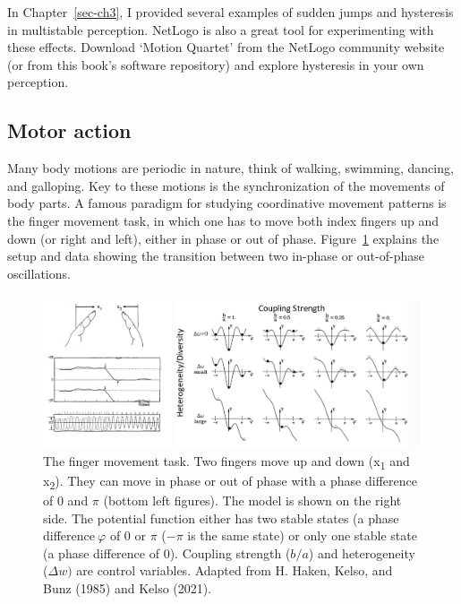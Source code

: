 \documentclass[
  a4paper,
  DIV=11,
  numbers=noendperiod,
  oneside]{scrreprt}
\begin{document}
In Chapter~\ref{sec-ch3}, I provided several examples of sudden jumps
and hysteresis in multistable perception. NetLogo is also a great tool
for experimenting with these effects. Download `Motion Quartet' from the
NetLogo community website (or from this book's software repository) and
explore hysteresis in your own perception.

\hypertarget{sec-Motor-action}{%
\subsection{Motor action}\label{sec-Motor-action}}

Many body motions are periodic in nature, think of walking, swimming,
dancing, and galloping. Key to these motions is the synchronization of
the movements of body parts. A famous paradigm for studying coordinative
movement patterns is the finger movement task, in which one has to move
both index fingers up and down (or right and left), either in phase or
out of phase. Figure~\ref{fig-ch5n-img7-old-45} explains the setup and
data showing the transition between two in-phase or out-of-phase
oscillations.

\begin{figure}

{\centering \includegraphics{media/ch5n/image7.jpg}

}

\caption{\label{fig-ch5n-img7-old-45}The finger movement task. Two
fingers move up and down (x\textsubscript{1} and x\textsubscript{2}).
They can move in phase or out of phase with a phase difference of 0 and
\(\pi\) (bottom left figures). The model is shown on the right side. The
potential function either has two stable states (a phase
difference\(\ \varphi\) of 0 or \(\pi\) (\(- \pi\) is the same state) or
only one stable state (a phase difference of 0). Coupling strength
(\(b/a\)) and heterogeneity (\(\Delta w)\) are control variables.
Adapted from H. Haken, Kelso, and Bunz (1985) and Kelso (2021).}

\end{figure}
\end{document}

